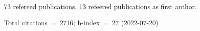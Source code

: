 73 refereed publications. 13 refeered publications as first author.

Total citations~=~2716; h-index~=~27 (2022-07-20)
